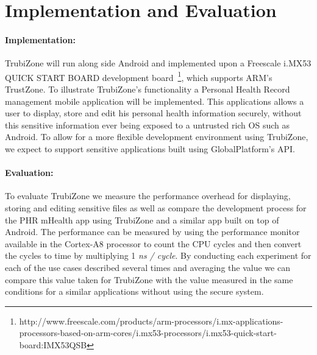 
% 
% 
\section{Implementation and Evaluation}
\label{sec:evaluation}


\paragraph{Implementation:}TrubiZone will run along side Android and implemented upon a Freescale i.MX53 QUICK START BOARD development board~\footnote{http://www.freescale.com/products/arm-processors/i.mx-applications-processors-based-on-arm-cores/i.mx53-processors/i.mx53-quick-start-board:IMX53QSB}, which supports ARM's TrustZone. To illustrate TrubiZone's functionality a Personal Health Record management mobile application will be implemented. This applications allows a user to display, store and edit his personal health information securely, without this sensitive information ever being exposed to a untrusted rich OS such as Android.
To allow for a more flexible development environment using TrubiZone, we expect to support sensitive applications built using GlobalPlatform's API.

\paragraph{Evaluation:}To evaluate TrubiZone we measure the performance overhead for displaying, storing and editing sensitive files as well as compare the development process for the PHR mHealth app using TrubiZone and a similar app built on top of Android. The performance can be measured by using the performance monitor available in the Cortex-A8 processor to count the CPU cycles and then convert the cycles to time by multiplying 1 \emph{ns / cycle}. By conducting each experiment for each of the use cases described several times and averaging the value we can compare this value taken for TrubiZone with the value measured in the same conditions for a similar applications without using the secure system.

